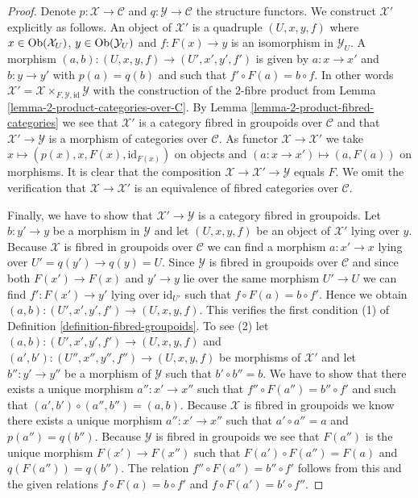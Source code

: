 \begin{proof}
Denote $p : \mathcal{X} \to \mathcal{C}$ and $q : \mathcal{Y} \to \mathcal{C}$
the structure functors. We construct $\mathcal{X}'$ explicitly as follows.
An object of $\mathcal{X}'$ is a quadruple $(U, x, y, f)$ where
$x \in \mathop{\mathrm{Ob}}\nolimits(\mathcal{X}_U)$, $y \in \mathop{\mathrm{Ob}}\nolimits(\mathcal{Y}_U)$
and $f : F(x) \to y$ is an isomorphism in $\mathcal{Y}_U$.
A morphism $(a, b) : (U, x, y, f) \to (U', x', y', f')$ is given
by $a : x \to x'$ and $b : y \to y'$ with $p(a) = q(b)$ and
such that $f' \circ F(a) = b \circ f$. In other words
$\mathcal{X}' = \mathcal{X} \times_{F, \mathcal{Y}, \text{id}} \mathcal{Y}$
with the construction of the $2$-fibre product from
Lemma \ref{lemma-2-product-categories-over-C}.
By
Lemma \ref{lemma-2-product-fibred-categories}
we see that $\mathcal{X}'$ is a category fibred in groupoids over
$\mathcal{C}$ and that $\mathcal{X}' \to \mathcal{Y}$ is a morphism of
categories over $\mathcal{C}$. As functor $\mathcal{X} \to \mathcal{X}'$ we take
$x \mapsto (p(x), x, F(x), \text{id}_{F(x)})$ on objects and
$(a : x \to x') \mapsto (a, F(a))$ on morphisms. It is clear that
the composition $\mathcal{X} \to \mathcal{X}' \to \mathcal{Y}$
equals $F$. We omit the verification that
$\mathcal{X} \to \mathcal{X}'$ is an equivalence of fibred categories over
$\mathcal{C}$.

\medskip\noindent
Finally, we have to show that $\mathcal{X}' \to \mathcal{Y}$ is a category
fibred in groupoids. Let $b : y' \to y$ be a morphism in $\mathcal{Y}$
and let $(U, x, y, f)$ be an object of $\mathcal{X}'$ lying over $y$.
Because $\mathcal{X}$ is fibred in groupoids over $\mathcal{C}$ we
can find a morphism $a : x' \to x$ lying over $U' = q(y') \to q(y) = U$.
Since $\mathcal{Y}$ is fibred in groupoids over $\mathcal{C}$ and since
both $F(x') \to F(x)$ and $y' \to y$ lie over the same morphism $U' \to U$
we can find $f' : F(x') \to y'$ lying over $\text{id}_{U'}$ such that
$f \circ F(a) = b \circ f'$. Hence we obtain
$(a, b) : (U', x', y', f') \to (U, x, y, f)$.
This verifies the first condition (1) of
Definition \ref{definition-fibred-groupoids}.
To see (2) let
$(a, b) : (U', x', y', f') \to (U, x, y, f)$ and
$(a', b') : (U'', x'', y'', f'') \to (U, x, y, f)$ be morphisms of
$\mathcal{X}'$ and let $b'' : y' \to y''$ be a morphism of $\mathcal{Y}$
such that $b' \circ b'' = b$. We have to show that there exists
a unique morphism $a'' : x' \to x''$ such that
$f'' \circ F(a'') = b'' \circ f'$ and such that
$(a', b') \circ (a'', b'') = (a, b)$. Because $\mathcal{X}$ is fibred
in groupoids we know there exists a unique morphism
$a'' : x' \to x''$ such that $a' \circ a'' = a$ and $p(a'') = q(b'')$.
Because $\mathcal{Y}$ is fibred in groupoids we see that
$F(a'')$ is the unique morphism $F(x') \to F(x'')$ such that
$F(a') \circ F(a'') = F(a)$ and $q(F(a'')) = q(b'')$. The relation
$f'' \circ F(a'') = b'' \circ f'$ follows from this and the given
relations $f \circ F(a) = b \circ f'$ and $f \circ F(a') = b' \circ f''$.
\end{proof}

